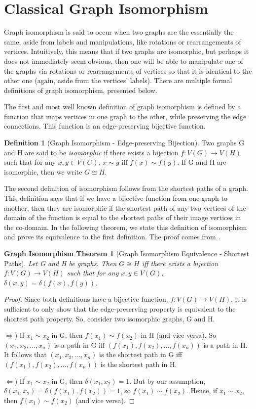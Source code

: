 \documentclass[12pt]{article}
\newtheorem{GraphIsomorphism}{Graph Isomorphism Theorem}
\theoremstyle{definition}
\newtheorem{defn}{Definition}[section]
\begin{document}
\section{Classical Graph Isomorphism}
Graph isomorphism is said to occur when two graphs are the essentially the same, aside from labels and manipulations, like rotations or rearrangements of vertices. Intuitively, this means that if two graphs are isomorphic, but perhaps it does not immediately seem obvious, then one will be able to manipulate one of the graphs via rotations or rearrangements of vertices so that it is identical to the other one (again, aside from the vertices' labels). There are multiple formal definitions of graph isomorphism, presented below.



The first and most well known definition of graph isomorphism is defined by a function that maps vertices in one graph to the other, while preserving the edge connections. This function is an edge-preserving bijective function.
\begin{defn}[Graph Isomorphism - Edge-preserving Bijection]
Two graphs G and H are said to be \textit{isomorphic} if there exists a bijection $f:V(G) \to V(H)$ such that for any $x, y \in V(G)$, $x \sim y$ iff $f(x) \sim f(y)$. If G and H are isomorphic, then we write $G \cong H$.
\end{defn}

The second definition of isomorphism follows from the shortest paths of a graph. This definition says that if we have a bijective function from one graph to another, then they are isomorphic if the shortest path of any two vertices of the domain of the function is equal to the shortest paths of their image vertices in the co-domain. In the following theorem, we state this definition of isomorphism and prove its equivalence to the first definition. The proof comes from \cite{shortest}.

\begin{GraphIsomorphism}[Graph Isomorphism Equivalence - Shortest Paths]
Let G and H be graphs. Then $G \cong H$ iff there exists a bijection $f:V(G) \to V(H)$ such that for any $x, y \in V(G)$, $\delta(x, y) = \delta(f(x), f(y))$.
\end{GraphIsomorphism}

\begin{proof}
Since both definitions have a bijective function, $f:V(G) \to V(H)$, it is sufficient to only show that the edge-preserving property is equivalent to the shortest path property. So, consider two isomorphic graphs, G and H.

$\Rightarrow$) If $x_1 \sim x_2$ in G, then $f(x_1) \sim f(x_2)$ in H (and vice versa). So $(x_1, x_2, ..., x_n)$ is a path in G iff $(f(x_1), f(x_2), ..., f(x_n))$ is a path in H. It follows that $(x_1, x_2, ..., x_n)$ is the shortest path in G iff $(f(x_1), f(x_2), ..., f(x_n))$ is the shortest path in H.

$\Leftarrow$) If $x_1 \sim x_2$ in G, then $\delta(x_1, x_2) = 1$. But by our assumption, $\delta(x_1, x_2) = \delta(f(x_1), f(x_2)) = 1$, so $f(x_1) \sim f(x_2)$. Hence, if $x_1 \sim x_2$, then $f(x_1) \sim f(x_2)$ (and vice versa).
\end{proof}
\end{document}
